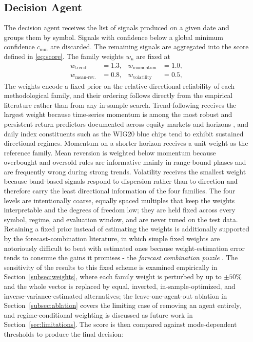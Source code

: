 \documentclass{ieeeaccess}
\begin{document}
\subsection{Decision Agent}
\label{subsec:decision}

The decision agent receives the list of signals produced on a given date and groups them by symbol. Signals with confidence below a global minimum confidence $c_{\min}$ are discarded. The remaining signals are aggregated into the score defined in \eqref{eq:score}. The family weights $w_\kappa$ are fixed at
\begin{equation}
\begin{aligned}
w_\mathrm{trend} &= 1.3, & w_\mathrm{momentum} &= 1.0, \\
w_\mathrm{mean\text{-}rev.} &= 0.8, & w_\mathrm{volatility} &= 0.5,
\end{aligned}
\end{equation}
The weights encode a fixed prior on the relative directional reliability of each methodological family, and their ordering follows directly from the empirical literature rather than from any in-sample search. Trend-following receives the largest weight because time-series momentum is among the most robust and persistent return predictors documented across equity markets and horizons \cite{moskowitz2012,asness2013}, and daily index constituents such as the WIG20 blue chips tend to exhibit sustained directional regimes. Momentum on a shorter horizon receives a unit weight as the reference family. Mean reversion is weighted below momentum because overbought and oversold rules are informative mainly in range-bound phases and are frequently wrong during strong trends. Volatility receives the smallest weight because band-based signals respond to dispersion rather than to direction and therefore carry the least directional information of the four families. The four levels are intentionally coarse, equally spaced multiples that keep the weights interpretable and the degrees of freedom low; they are held fixed across every symbol, regime, and evaluation window, and are never tuned on the test data. Retaining a fixed prior instead of estimating the weights is additionally supported by the forecast-combination literature, in which simple fixed weights are notoriously difficult to beat with estimated ones because weight-estimation error tends to consume the gains it promises - the \emph{forecast combination puzzle} \cite{smithwallis2009,claeskens2016}. The sensitivity of the results to this fixed scheme is examined empirically in Section~\ref{subsec:weights}, where each family weight is perturbed by up to $\pm 50\%$ and the whole vector is replaced by equal, inverted, in-sample-optimized, and inverse-variance-estimated alternatives; the leave-one-agent-out ablation in Section~\ref{subsec:ablation} covers the limiting case of removing an agent entirely, and regime-conditional weighting is discussed as future work in Section~\ref{sec:limitations}. The score is then compared against mode-dependent thresholds to produce the final decision:
\end{document}
